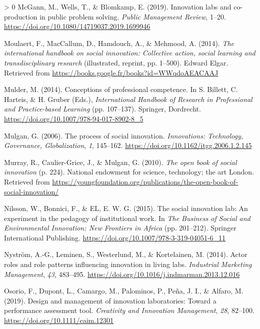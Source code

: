 \documentclass[]{elsarticle} %
\newlength{\cslhangindent}
\newenvironment{CSLReferences}[3] %
 {%
  \setlength{\parindent}{0pt}
  \ifodd #1 \everypar{\setlength{\hangindent}{\cslhangindent}}\ignorespaces\fi
  \ifnum #2 > 0
  \setlength{\parskip}{#2\baselineskip}
  \fi
 }%
 {}
\begin{document}
\begin{CSLReferences}{1}{0}
\leavevmode\hypertarget{ref-McGann2019}{}%
McGann, M., Wells, T., \& Blomkamp, E. (2019). Innovation labs and
co-production in public problem solving. \emph{Public Management
Review}, 1--20. \url{https://doi.org/10.1080/14719037.2019.1699946}

\leavevmode\hypertarget{ref-Moulaert2014}{}%
Moulaert, F., MacCallum, D., Hamdouch, A., \& Mehmood, A. (2014).
\emph{The international handbook on social innovation: Collective
action, social learning and transdisciplinary research} (illustrated,
reprint, pp. 1--500). Edward Elgar. Retrieved from
\url{https://books.google.fr/books?id=WWqdoAEACAAJ}

\leavevmode\hypertarget{ref-Mulder2014}{}%
Mulder, M. (2014). Conceptions of professional competence. In S.
Billett, C. Harteis, \& H. Gruber (Eds.), \emph{International Handbook
of Research in Professional and Practice-based Learning} (pp. 107--137).
Springer, Dordrecht. \url{https://doi.org/10.1007/978-94-017-8902-8_5}

\leavevmode\hypertarget{ref-Mulgan2006}{}%
Mulgan, G. (2006). The process of social innovation. \emph{Innovations:
Technology, Governance, Globalization}, \emph{1}, 145--162.
\url{https://doi.org/10.1162/itgg.2006.1.2.145}

\leavevmode\hypertarget{ref-Murray2010}{}%
Murray, R., Caulier-Grice, J., \& Mulgan, G. (2010). \emph{The open book
of social innovation} (p. 224). National endowment for science,
technology; the art London. Retrieved from
\url{https://youngfoundation.org/publications/the-open-book-of-social-innovation/}

\leavevmode\hypertarget{ref-Nilsson2015}{}%
Nilsson, W., Bonnici, F., \& EL, E. W. G. (2015). The social innovation
lab: An experiment in the pedagogy of institutional work. In \emph{The
Business of Social and Environmental Innovation: New Frontiers in
Africa} (pp. 201--212). Springer International Publishing.
\url{https://doi.org/10.1007/978-3-319-04051-6_11}

\leavevmode\hypertarget{ref-Nystrom2014}{}%
Nyström, A.-G., Leminen, S., Westerlund, M., \& Kortelainen, M. (2014).
Actor roles and role patterns influencing innovation in living labs.
\emph{Industrial Marketing Management}, \emph{43}, 483--495.
\url{https://doi.org/10.1016/j.indmarman.2013.12.016}

\leavevmode\hypertarget{ref-Osorio2019}{}%
Osorio, F., Dupont, L., Camargo, M., Palominos, P., Peña, J. I., \&
Alfaro, M. (2019). Design and management of innovation laboratories:
Toward a performance assessment tool. \emph{Creativity and Innovation
Management}, \emph{28}, 82--100.
\url{https://doi.org/10.1111/caim.12301}


\end{CSLReferences}
\end{document}
